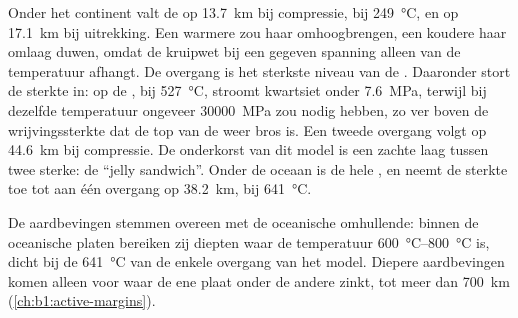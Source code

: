 Onder het continent valt de  op \qty{13.7}{km} bij compressie, bij \qty{249}{\degreeCelsius}, en op \qty{17.1}{km} bij uitrekking. Een warmere  zou haar omhoogbrengen, een koudere haar omlaag duwen, omdat de kruipwet bij een gegeven spanning alleen van de temperatuur afhangt. De overgang is het sterkste niveau van de .
Daaronder stort de sterkte in: op de , bij \qty{527}{\degreeCelsius}, stroomt kwartsiet onder \qty{7.6}{MPa}, terwijl  bij dezelfde temperatuur ongeveer \qty{30000}{MPa} zou nodig hebben, zo ver boven de wrijvingssterkte dat de top van de  weer bros is. Een tweede overgang volgt op \qty{44.6}{km} bij compressie. De onderkorst van dit model is een zachte laag tussen twee sterke: de ``jelly sandwich''. Onder de oceaan is de hele  , en neemt de sterkte toe tot aan één overgang op \qty{38.2}{km}, bij \qty{641}{\degreeCelsius}.

De aardbevingen stemmen overeen met de oceanische omhullende: binnen de oceanische platen bereiken zij diepten waar de temperatuur \qtyrange{600}{800}{\degreeCelsius} is, dicht bij de \qty{641}{\degreeCelsius} van de enkele overgang van het model. Diepere aardbevingen komen alleen voor waar de ene plaat onder de andere zinkt, tot meer dan \qty{700}{km} (\cref{ch:b1:active-margins}).

